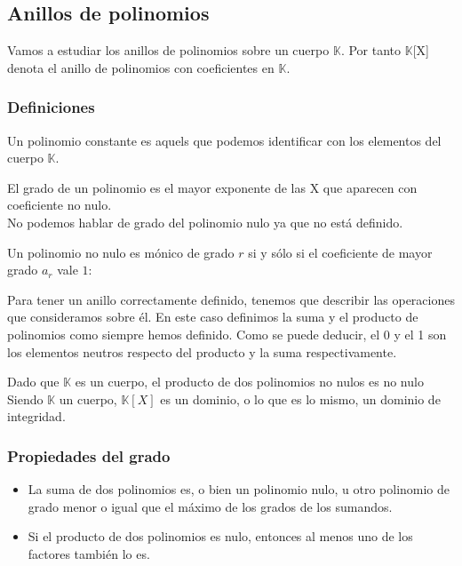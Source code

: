 \documentclass[nochap]{apuntes}
\begin{document}
\subsection{Anillos de polinomios}

Vamos a estudiar los anillos de polinomios sobre un cuerpo $\mathbb{K}$. Por tanto $\mathbb{K}$[X] denota el anillo de polinomios con
coeficientes en $\mathbb{K}$.

\subsubsection{Definiciones}
\begin{defn} Un polinomio constante es aquels que podemos identificar con los elementos del cuerpo $\mathbb{K}$.
\end{defn}

\begin{defn}
 El grado de un polinomio es el mayor exponente de las X que aparecen con coeficiente no nulo.\\
 No podemos hablar de grado del polinomio nulo ya que no está definido.
\end{defn}

\begin{defn}
 Un polinomio no nulo es mónico de grado $r$ si y sólo si el coeficiente de mayor grado $a_r$ vale $1$:
\end{defn}

Para tener un anillo correctamente definido, tenemos que describir las operaciones que consideramos sobre él. En este caso definimos la suma y el producto de polinomios como siempre hemos definido. Como se puede deducir, el 0 y el 1 son los elementos neutros respecto del producto y la suma respectivamente.

\obs Dado que $\mathbb{K}$  es un cuerpo, el producto de dos polinomios no nulos es no nulo
\obs Siendo $\mathbb{K}$ un cuerpo, $\mathbb{K}[X]$ es un dominio, o lo que es lo mismo, un dominio de integridad.

\subsubsection{Propiedades del grado}
\begin{itemize}
 \item La suma de dos polinomios es, o bien un polinomio nulo, u otro polinomio de grado menor o igual que el máximo de los grados de los sumandos.
 \item Si el producto de dos polinomios es nulo, entonces al menos uno de los factores también lo es.
\end{itemize}
\end{document}
